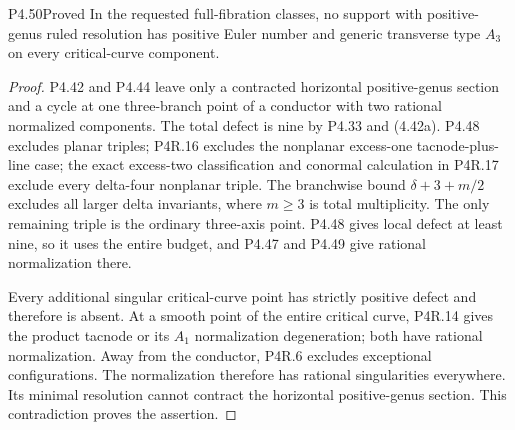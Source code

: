 \begin{statement}{P4.50}{Proved}
In the requested full-fibration classes, no support
with positive-genus ruled resolution has positive
Euler number and generic transverse type $A_3$
on every critical-curve component.
\end{statement}
\begin{proof}
P4.42 and P4.44 leave only a contracted horizontal
positive-genus section and a cycle at one three-branch
point of a conductor with two rational normalized
components. The total defect is nine by P4.33 and
(4.42a). P4.48 excludes planar triples; P4R.16
excludes the nonplanar excess-one tacnode-plus-line
case; the exact excess-two classification and conormal
calculation in P4R.17 exclude
every delta-four nonplanar triple. The branchwise bound
$\delta+3+m/2$ excludes all larger delta invariants,
where $m\ge3$ is total multiplicity.
The only remaining triple is the ordinary three-axis
point. P4.48 gives local defect at least nine, so it
uses the entire budget, and P4.47 and P4.49 give
rational normalization there.

Every additional singular critical-curve point has
strictly positive defect and therefore is absent.
At a smooth point of the entire critical curve,
P4R.14 gives the product tacnode or its $A_1$
normalization degeneration; both have rational
normalization. Away from the conductor, P4R.6
excludes exceptional configurations. The normalization
therefore has rational singularities everywhere.
Its minimal resolution cannot contract the horizontal
positive-genus section. This contradiction proves
the assertion.
\end{proof}
